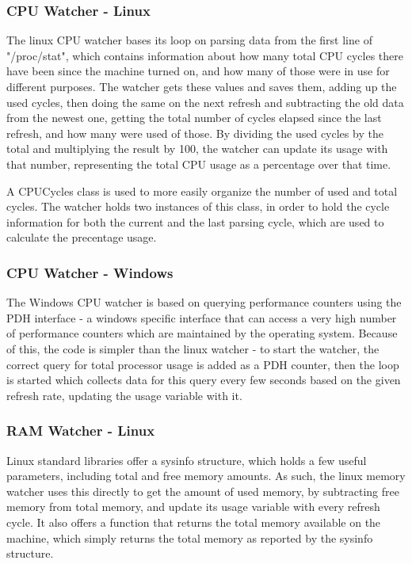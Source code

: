 \documentclass{l3proj}
\begin{document}
\subsubsection{CPU Watcher - Linux}

The linux CPU watcher bases its loop on parsing data from the first line of "/proc/stat", which contains information about how many total CPU cycles there have been since the machine turned on, and how many of those were in use for different purposes. The watcher gets these values and saves them, adding up the used cycles, then doing the same on the next refresh and subtracting the old data from the newest one, getting the total number of cycles elapsed since the last refresh, and how many were used of those. By dividing the used cycles by the total and multiplying the result by 100, the watcher can update its usage with that number, representing the total CPU usage as a percentage over that time.

A CPUCycles class is used to more easily organize the number of used and total cycles. The watcher holds two instances of this class, in order to hold the cycle information for both the current and the last parsing cycle, which are used to calculate the precentage usage.

\subsubsection{CPU Watcher - Windows}

The Windows CPU watcher is based on querying performance counters using the PDH interface - a windows specific interface that can access a very high number of performance counters which are maintained by the operating system. Because of this, the code is simpler than the linux watcher - to start the watcher, the correct query for total processor usage is added as a PDH counter, then the loop is started which collects data for this query every few seconds based on the given refresh rate, updating the usage variable with it.

\subsubsection{RAM Watcher - Linux}

Linux standard libraries offer a sysinfo structure, which holds a few useful parameters, including total and free memory amounts. As such, the linux memory watcher uses this directly to get the amount of used memory, by subtracting free memory from total memory, and update its usage variable with every refresh cycle. It also offers a function that returns the total memory available on the machine, which simply returns the total memory as reported by the sysinfo structure.
\end{document}

